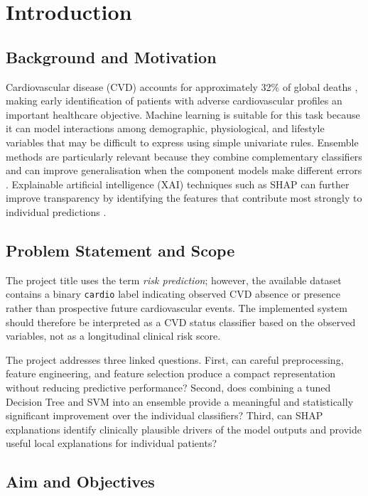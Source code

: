 \documentclass[11pt,a4paper]{article}
\newcommand{\code}[1]{\texttt{#1}}
\begin{document}
\section{Introduction}

\subsection{Background and Motivation}

Cardiovascular disease (CVD) accounts for approximately 32\% of global deaths \cite{who2025}, making early identification of patients with adverse cardiovascular profiles an important healthcare objective. Machine learning is suitable for this task because it can model interactions among demographic, physiological, and lifestyle variables that may be difficult to express using simple univariate rules. Ensemble methods are particularly relevant because they combine complementary classifiers and can improve generalisation when the component models make different errors \cite{patra2023,tiwari2022}. Explainable artificial intelligence (XAI) techniques such as SHAP can further improve transparency by identifying the features that contribute most strongly to individual predictions \cite{shah2025}.

\subsection{Problem Statement and Scope}

The project title uses the term \emph{risk prediction}; however, the available dataset contains a binary \code{cardio} label indicating observed CVD absence or presence rather than prospective future cardiovascular events. The implemented system should therefore be interpreted as a CVD status classifier based on the observed variables, not as a longitudinal clinical risk score.

The project addresses three linked questions. First, can careful preprocessing, feature engineering, and feature selection produce a compact representation without reducing predictive performance? Second, does combining a tuned Decision Tree and SVM into an ensemble provide a meaningful and statistically significant improvement over the individual classifiers? Third, can SHAP explanations identify clinically plausible drivers of the model outputs and provide useful local explanations for individual patients?

\subsection{Aim and Objectives}
\end{document}
